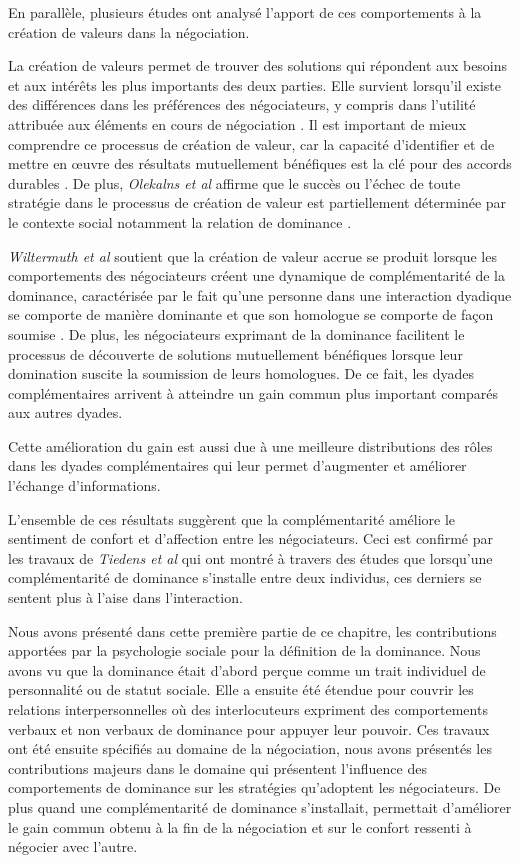 	
	En parallèle, plusieurs études ont analysé l'apport de ces comportements à la création de valeurs dans la négociation.
	
	La création de valeurs permet de trouver des solutions qui répondent aux besoins et aux intérêts les plus importants des deux parties. Elle survient lorsqu'il existe des différences dans les préférences des négociateurs, y compris dans l'utilité attribuée  aux éléments en cours de négociation \cite{lax1986managerial}. 
	Il est important de mieux comprendre ce processus de création de valeur, car la capacité d'identifier et de mettre en œuvre des résultats mutuellement bénéfiques est la clé pour des accords durables \cite{wiltermuth2015benefits}.
	De plus, \emph{Olekalns et al} affirme que le succès ou l'échec de toute stratégie dans le processus de création de valeur est partiellement déterminée par le contexte social notamment la relation de dominance \cite{olekalns2013dyadic}.
	
	\emph{Wiltermuth et al} soutient que la création de valeur accrue se produit lorsque les comportements des négociateurs créent une dynamique de complémentarité de la dominance, caractérisée par le fait qu'une personne dans une interaction dyadique se comporte de manière dominante et que son homologue se comporte de façon soumise \cite{wiltermuth2015benefits}. De plus, les négociateurs exprimant de la dominance facilitent le processus de découverte de solutions mutuellement bénéfiques lorsque leur domination suscite la soumission de leurs homologues. De ce fait, les dyades complémentaires arrivent à atteindre un gain commun plus important comparés aux autres dyades.
	
	Cette amélioration du gain est aussi due à une meilleure distributions des rôles dans les dyades complémentaires qui leur permet d'augmenter et améliorer l'échange d'informations. 
	
	L'ensemble de ces résultats suggèrent que la complémentarité améliore le sentiment de confort et d'affection entre les négociateurs. Ceci est confirmé par les travaux de \emph{Tiedens et al} \cite{tiedens2003power} qui ont montré à travers des études que lorsqu'une complémentarité de dominance s'installe entre deux individus, ces derniers se sentent plus à l'aise dans l'interaction. 
	
	
	Nous avons présenté dans cette première partie de ce chapitre, les contributions apportées par la psychologie sociale pour la définition de la dominance. Nous avons vu que la dominance était d'abord perçue comme un trait individuel de personnalité ou de statut sociale. Elle a ensuite été étendue pour couvrir les relations interpersonnelles où des interlocuteurs expriment des comportements verbaux et non verbaux de dominance pour appuyer leur pouvoir. 
	Ces travaux ont été ensuite spécifiés au domaine de la négociation, nous avons présentés les contributions majeurs dans le domaine qui présentent l'influence des comportements de dominance sur les stratégies qu'adoptent les négociateurs. De plus quand une complémentarité de dominance s'installait, permettait d'améliorer le gain commun obtenu à la fin de la négociation et sur le confort ressenti à négocier avec l'autre.
	
